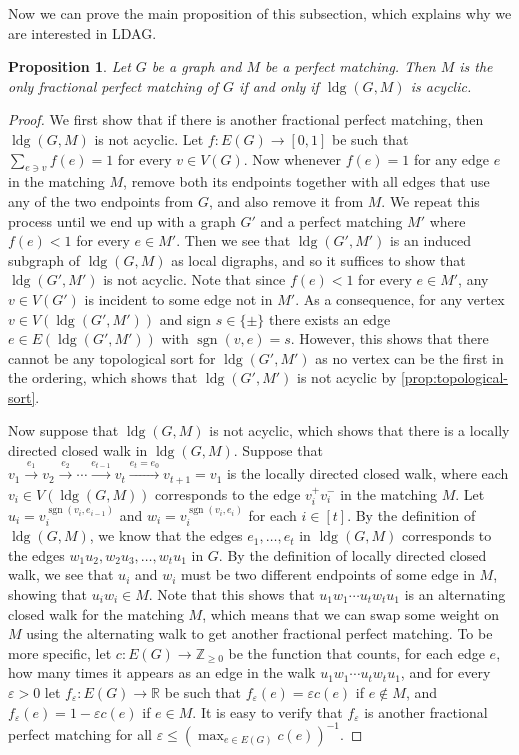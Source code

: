 \documentclass[reqno,11pt]{amsart}
\numberwithin{equation}{section}
\newtheorem{proposition}[theorem]{Proposition}
\theoremstyle{definition}
\theoremstyle{remark}
\DeclareMathOperator{\sgn}{sgn}
\DeclareMathOperator{\ldg}{ldg}
\newcommand{\RR}{\mathbb{R}}
\newcommand{\ZZ}{\mathbb{Z}}
\begin{document}
Now we can prove the main proposition of this subsection, which explains why we are interested in LDAG.

\begin{proposition}\label{prop:unique-pm-imply-ldag}
    Let $G$ be a graph and $M$ be a perfect matching.
    Then $M$ is the only fractional perfect matching of $G$ if and only if $\ldg(G,M)$ is acyclic.
\end{proposition}
\begin{proof}
    We first show that if there is another fractional perfect matching, then $\ldg(G,M)$ is not acyclic.
    Let $f\colon E(G)\to [0,1]$ be such that $\sum_{e\ni v}f(e)=1$ for every $v\in V(G)$.
    Now whenever $f(e)=1$ for any edge $e$ in the matching $M$, remove both its endpoints together with all edges that use any of the two endpoints from $G$, and also remove it from $M$.
    We repeat this process until we end up with a graph $G'$ and a perfect matching $M'$ where $f(e)<1$ for every $e\in M'$.
    Then we see that $\ldg(G',M')$ is an induced subgraph of $\ldg(G,M)$ as local digraphs, and so it suffices to show that $\ldg(G',M')$ is not acyclic.
    Note that since $f(e)<1$ for every $e\in M'$, any $v\in V(G')$ is incident to some edge not in $M'$.
    As a consequence, for any vertex $v\in V(\ldg(G',M'))$ and sign $s\in\{\pm\}$ there exists an edge $e\in E(\ldg(G',M'))$ with $\sgn(v,e)=s$.
    However, this shows that there cannot be any topological sort for $\ldg(G',M')$ as no vertex can be the first in the ordering, which shows that $\ldg(G',M')$ is not acyclic by \cref{prop:topological-sort}.

    Now suppose that $\ldg(G,M)$ is not acyclic, which shows that there is a locally directed closed walk in $\ldg(G,M)$.
    Suppose that $v_1\xrightarrow{e_1}v_2\xrightarrow{e_2}\cdots\xrightarrow{e_{t-1}}v_t\xrightarrow{e_t=e_0}v_{t+1}=v_1$ is the locally directed closed walk, where each $v_i\in V(\ldg(G,M))$ corresponds to the edge $v_i^+v_i^-$ in the matching $M$.
    Let $u_i=v_i^{\sgn(v_i,e_{i-1})}$ and $w_i=v_{i}^{\sgn(v_i,e_i)}$ for each $i\in[t]$.
    By the definition of $\ldg(G,M)$, we know that the edges $e_1,\ldots, e_t$ in $\ldg(G,M)$ corresponds to the edges $w_1u_2,w_2u_3,\ldots, w_tu_1$ in $G$.
    By the definition of locally directed closed walk, we see that $u_i$ and $w_i$ must be two different endpoints of some edge in $M$, showing that $u_iw_i\in M$.
    Note that this shows that $u_1w_1\cdots u_tw_tu_1$ is an alternating closed walk for the matching $M$, which means that we can swap some weight on $M$ using the alternating walk to get another fractional perfect matching.
    To be more specific, let $c\colon E(G)\to\ZZ_{\geq 0}$ be the function that counts, for each edge $e$, how many times it appears as an edge in the walk $u_1w_1\cdots u_tw_tu_{1}$, and for every $\varepsilon>0$ let $f_{\varepsilon}:E(G)\to \RR$ be such that $f_{\varepsilon}(e)=\varepsilon c(e)$ if $e\not\in M$, and $f_{\varepsilon}(e) = 1-\varepsilon c(e)$ if $e\in M$.
    It is easy to verify that $f_{\varepsilon}$ is another fractional perfect matching for all $\varepsilon \leq \left(\max_{e\in E(G)}c(e)\right)^{-1}$.
\end{proof}
\end{document}
